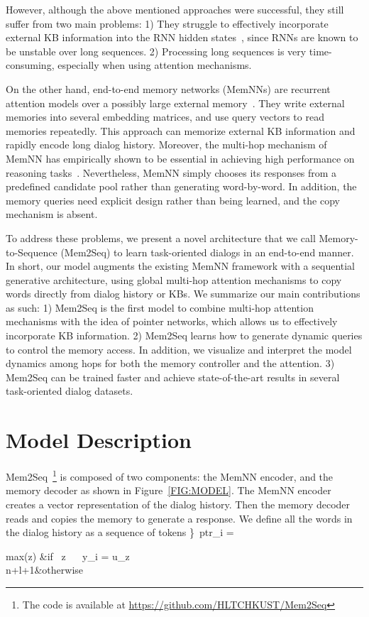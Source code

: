 \documentclass[11pt,a4paper]{article}
\begin{document}
However, although the above mentioned approaches were successful, they still suffer from two main problems: 
1) They struggle to effectively incorporate external KB information into the RNN hidden states~\cite{sukhbaatar2015end}, since RNNs are known to be unstable over long sequences.
2) Processing long sequences is very time-consuming, especially when using attention mechanisms.

On the other hand, end-to-end memory networks (MemNNs) are recurrent attention models over a possibly large external memory~\cite{sukhbaatar2015end}. They write external memories into several embedding matrices, and use query vectors to read memories repeatedly. This approach can memorize external KB information and rapidly encode long dialog history. Moreover, the multi-hop mechanism of MemNN has empirically shown to be essential in achieving high performance on reasoning tasks~\cite{bordes2016learning}. Nevertheless, MemNN simply chooses its responses from a predefined candidate pool rather than generating word-by-word. In addition, the memory queries need explicit design rather than being learned, and the copy mechanism is absent.

To address these problems, we present a novel architecture that we call Memory-to-Sequence (Mem2Seq) to learn task-oriented dialogs in an end-to-end manner. In short, our model augments the existing MemNN framework with a sequential generative architecture, using global multi-hop attention mechanisms to copy words directly from dialog history or KBs. We summarize our main contributions as such: 
1) Mem2Seq is the first model to combine multi-hop attention mechanisms with the idea of pointer networks, which allows us to effectively incorporate KB information. 
2) Mem2Seq learns how to generate dynamic queries to control the memory access. In addition, we visualize and interpret the model dynamics among hops for both the memory controller and the attention.
3) Mem2Seq can be trained faster and achieve state-of-the-art results in several task-oriented dialog datasets.

\section{Model Description}
Mem2Seq~\footnote{The code is available at \url{https://github.com/HLTCHKUST/Mem2Seq} } is composed of two components: the MemNN encoder, and the memory decoder as shown in Figure~\ref{FIG:MODEL}.
The MemNN encoder creates a vector representation of the dialog history. Then the memory decoder reads and copies the memory to generate a response. 
We define all the words in the dialog history as a sequence of tokens \}\
{ptr}_i = 
\begin{cases} 
max(z) &\mbox{if } \exists z \  \ y_i = u_z \\ 
n+l+1&\mbox{otherwise} 
\end{cases} 
\label{eq1}
\end{document}
